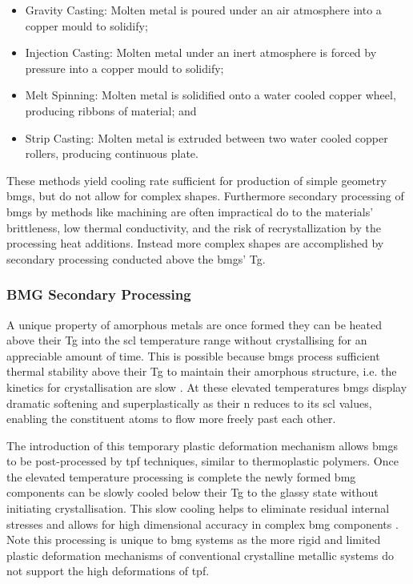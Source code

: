 \documentclass[a4paper,12pt,oneside]{report}%
\begin{document}
\begin{itemize}
	\item Gravity Casting: Molten metal is poured under an air  atmosphere into a copper mould to solidify;
	\item Injection Casting: Molten metal under an inert atmosphere is forced by pressure into a copper mould to solidify;
	\item Melt Spinning: Molten metal is solidified onto a water cooled copper wheel, producing ribbons of material; and
	\item Strip Casting: Molten metal is extruded between two water cooled copper rollers, producing continuous plate. 
\end{itemize}

These methods yield cooling rate sufficient for production of simple geometry \glspl{bmg}, but do not allow for complex shapes. Furthermore secondary processing of \glspl{bmg} by methods like machining are often impractical do to the materials' brittleness, low thermal conductivity, and the risk of recrystallization by the processing heat additions. Instead more complex shapes are accomplished by secondary processing conducted above the \glspl{bmg}' \gls{Tg}. 

\subsubsection{BMG Secondary Processing}
A unique property of amorphous metals are once formed they can be heated above their \gls{Tg} into the \gls{scl} temperature range without crystallising for an appreciable amount of time. This is possible because \glspl{bmg} process sufficient thermal stability above their \gls{Tg} to maintain their amorphous structure, i.e. the kinetics for crystallisation are slow \cite{Schroers2010}. At these elevated temperatures \glspl{bmg} display dramatic softening and superplastically as their \gls{n} reduces to its \gls{scl} values, enabling the constituent atoms to flow more freely past each other. 

The introduction of this temporary plastic deformation mechanism allows \glspl{bmg} to be post-processed by \gls{tpf} techniques, similar to thermoplastic polymers. Once the elevated temperature processing is complete the newly formed \gls{bmg} components can be slowly cooled below their \gls{Tg} to the glassy state without initiating crystallisation. This slow cooling helps to eliminate residual internal stresses and allows for high dimensional accuracy in complex \gls{bmg} components \cite{Schroers2010}. Note this processing is unique to \gls{bmg} systems as the more rigid and limited plastic deformation mechanisms of conventional crystalline metallic systems do not support the high deformations of \gls{tpf}.
\end{document}
